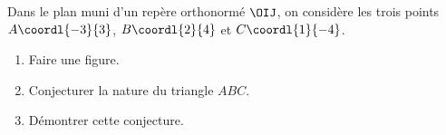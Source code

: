 \begin{exo}
	Dans le plan muni d'un repère orthonormé $\OIJ$, on considère les trois points $A\coordl{-3}{3}$, $B\coordl{2}{4}$ et $C\coordl{1}{-4}$.
	\begin{enumerate}
		\item Faire une figure.
		\item Conjecturer la nature du triangle $ABC$.
		\item Démontrer cette conjecture.
	\end{enumerate}
\end{exo}
